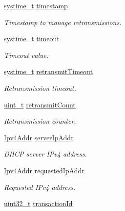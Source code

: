 \begin{DoxyCompactItemize}
\hyperlink{compiler__port_8h_ae3e32a98d431a02106616da3071832dd}{systime\+\_\+t} \hyperlink{struct__DhcpClientContext_ad51c6620d753b7322b8f07688b86e8a3}{timestamp}
\begin{DoxyCompactList}\small\item\em Timestamp to manage retransmissions. \end{DoxyCompactList}\item 
\hyperlink{compiler__port_8h_ae3e32a98d431a02106616da3071832dd}{systime\+\_\+t} \hyperlink{struct__DhcpClientContext_af15562d591ed84863a22639bab13f12c}{timeout}
\begin{DoxyCompactList}\small\item\em Timeout value. \end{DoxyCompactList}\item 
\hyperlink{compiler__port_8h_ae3e32a98d431a02106616da3071832dd}{systime\+\_\+t} \hyperlink{struct__DhcpClientContext_a4715d2ef9846320ea545dfc8fcab57de}{retransmit\+Timeout}
\begin{DoxyCompactList}\small\item\em Retransmission timeout. \end{DoxyCompactList}\item 
\hyperlink{compiler__port_8h_a12a1e9b3ce141648783a82445d02b58d}{uint\+\_\+t} \hyperlink{struct__DhcpClientContext_aae9928c7c0256e4d785521940626b7ad}{retransmit\+Count}
\begin{DoxyCompactList}\small\item\em Retransmission counter. \end{DoxyCompactList}\item 
\hyperlink{ipv4_8h_a411debb3d770caa0c06d3f73367da37f}{Ipv4\+Addr} \hyperlink{struct__DhcpClientContext_a09359e88296df298b57657c63acab7ac}{server\+Ip\+Addr}
\begin{DoxyCompactList}\small\item\em D\+H\+CP server I\+Pv4 address. \end{DoxyCompactList}\item 
\hyperlink{ipv4_8h_a411debb3d770caa0c06d3f73367da37f}{Ipv4\+Addr} \hyperlink{struct__DhcpClientContext_a397b23a0a96d869807dd6fd13c236672}{requested\+Ip\+Addr}
\begin{DoxyCompactList}\small\item\em Requested I\+Pv4 address. \end{DoxyCompactList}\item 
\hyperlink{stdint_8h_a435d1572bf3f880d55459d9805097f62}{uint32\+\_\+t} \hyperlink{struct__DhcpClientContext_aa09dec28d66f3b393f4295582140d8c1}{transaction\+Id}

\end{DoxyCompactItemize}
